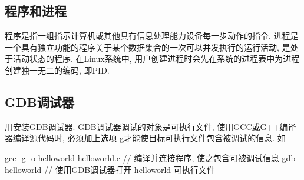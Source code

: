 
\subsection{程序和进程}

程序是指一组指示计算机或其他具有信息处理能力设备每一步动作的指令.
进程是一个具有独立功能的程序关于某个数据集合的一次可以并发执行的运行活动, 
是处于活动状态的程序. 
在Linux系统中, 用户创建进程时会先在系统的进程表中为进程创建独一无二的编码,
即PID.


\subsection{GDB调试器}
用安装GDB调试器.
GDB调试器调试的对象是可执行文件, 使用GCC或G++编译器编译源代码时, 
必须加上选项-g才能使目标可执行文件包含被调试的信息. 如
\begin{shell}
 gcc -g -o helloworld helloworld.c // 编译并连接程序, 使之包含可被调试信息
 gdb helloworld // 使用GDB调试器打开 helloworld 可执行文件
\end{shell}

